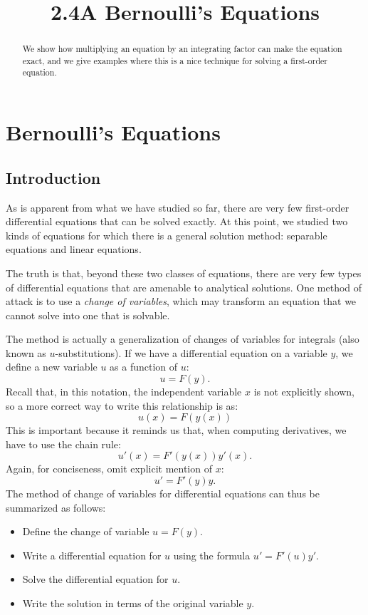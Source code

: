 \documentclass{ximera}
\title{2.4A Bernoulli's Equations}
\begin{document}
\begin{abstract}
We show how multiplying an equation by an integrating factor can make the equation exact, and we give examples where this is a nice technique for solving a first-order equation.
\end{abstract}

\maketitle

\section*{Bernoulli's Equations}

\subsection*{Introduction}
As is apparent from what we have studied so far, there are very few first-order differential equations that can be solved exactly. At this point, we studied two kinds of equations for which there is a general solution method: separable equations and linear equations.

The truth is that, beyond these two classes of equations, there are very few types of differential equations that are amenable to analytical solutions. One method of attack is to use a \textit{change of variables}, which may transform an equation that we cannot solve into one that is solvable.

The method is actually a generalization of changes of variables for integrals (also known as $u$-substitutions). If we have a differential equation on a variable $y$, we define a new variable $u$ as a function of $u$:
\[
u=F(y).
\]
Recall that, in this notation, the independent variable $x$ is not explicitly shown, so a more correct way to write this relationship is as:
\[
u(x)=F(y(x))
\]
This is important because it reminds us that, when computing derivatives, we have to use the chain rule:
\[
u'(x)=F'(y(x))y'(x).
\]
Again, for conciseness, omit explicit mention of $x$:
\[
u'=F'(y)y.
\]
The method of change of variables for differential equations can thus be summarized as follows:

\begin{itemize}
\item Define the change of variable $u=F(y)$.
\item Write a differential equation for $u$ using the formula $u'=F'(u)y'$.
\item Solve the differential equation for $u$.
\item Write the solution in terms of the original variable $y$.
\end{itemize}
\end{document}
